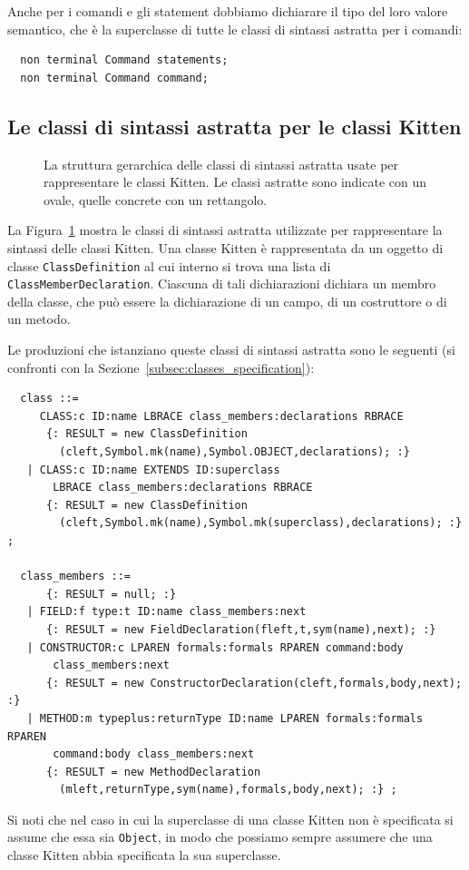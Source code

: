 Anche per i comandi e gli statement
dobbiamo dichiarare il tipo del loro valore semantico, che \`e la
superclasse di tutte le classi di sintassi astratta per i comandi:
%
\begin{verbatim}
  non terminal Command statements;
  non terminal Command command;
\end{verbatim}
%
\subsection{Le classi di sintassi astratta per le classi Kitten}
  \label{subsec:classes_abstract}
%
\begin{figure}[t]
\begin{center}
\end{center}
\caption{La struttura gerarchica delle classi di sintassi astratta usate
         per rappresentare le classi Kitten.
         Le classi astratte sono indicate con un
         ovale, quelle concrete con un rettangolo.}
  \label{fig:classes_hierarchy}
\end{figure}
%
La Figura~\ref{fig:classes_hierarchy} mostra le classi di sintassi astratta
utilizzate per rappresentare la sintassi delle classi
Kitten. Una classe Kitten \`e rappresentata da un oggetto
di classe \texttt{ClassDefinition} al cui interno si trova una
lista di \texttt{ClassMemberDeclaration}. Ciascuna di tali dichiarazioni
dichiara un membro della classe, che pu\`o essere la dichiarazione di
un campo, di un costruttore o di un metodo.

Le produzioni che istanziano queste classi di sintassi astratta sono le
seguenti (si confronti con la Sezione~\ref{subsec:classes_specification}):
%
\begin{verbatim}
  class ::=
     CLASS:c ID:name LBRACE class_members:declarations RBRACE
      {: RESULT = new ClassDefinition
        (cleft,Symbol.mk(name),Symbol.OBJECT,declarations); :}
   | CLASS:c ID:name EXTENDS ID:superclass
       LBRACE class_members:declarations RBRACE
      {: RESULT = new ClassDefinition
        (cleft,Symbol.mk(name),Symbol.mk(superclass),declarations); :} ;

  class_members ::=
      {: RESULT = null; :}
   | FIELD:f type:t ID:name class_members:next
      {: RESULT = new FieldDeclaration(fleft,t,sym(name),next); :}
   | CONSTRUCTOR:c LPAREN formals:formals RPAREN command:body
       class_members:next
      {: RESULT = new ConstructorDeclaration(cleft,formals,body,next); :}
   | METHOD:m typeplus:returnType ID:name LPAREN formals:formals RPAREN
       command:body class_members:next
      {: RESULT = new MethodDeclaration
        (mleft,returnType,sym(name),formals,body,next); :} ;
\end{verbatim}
%
Si noti che nel caso in cui la superclasse di una classe Kitten non \`e
specificata si assume che essa sia \texttt{Object}, in modo che possiamo
sempre assumere che una classe Kitten abbia specificata la sua superclasse.

